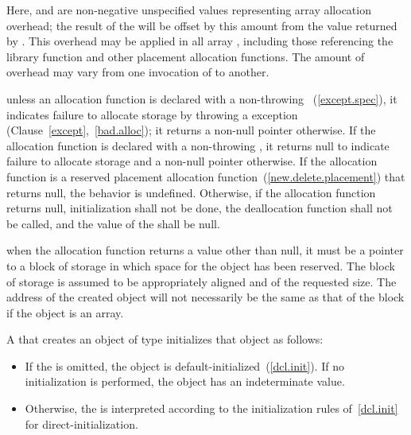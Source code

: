 Here,  and  are non-negative unspecified values
representing array allocation overhead; the result of the
 will be offset by this amount from the value
returned by . This overhead may be applied in all
array , including those referencing the
library function  and other
placement allocation functions. The amount of overhead may vary from one
invocation of  to another.
\exitexample 

\pnum
\enternote 
unless an allocation function is declared with a non-throwing
~(\ref{except.spec}),
it indicates failure to allocate storage by throwing a
%
%
 exception (Clause~\ref{except},~\ref{bad.alloc});
it returns a non-null pointer otherwise. If the allocation function is
declared with a non-throwing ,
it returns null to indicate failure to allocate storage
and a non-null pointer otherwise.
\exitnote 
If the allocation function is a reserved placement allocation
function~(\ref{new.delete.placement}) that returns null,
the behavior is undefined.
Otherwise,
if the allocation function returns null, initialization shall not be
done, the deallocation function shall not be called, and the value of
the  shall be null.

\pnum
\enternote 
when the allocation function returns a value other than null, it must be
a pointer to a block of storage in which space for the object has been
reserved. The block of storage is assumed to be appropriately aligned
and of the requested size. The address of the created object will not
necessarily be the same as that of the block if the object is an array.
\exitnote 

\pnum
{}%
%
%
%
%
%
%
A  that creates an object of type 
initializes that object as follows:

\begin{itemize}
\item If the  is omitted, the object is
default-initialized~(\ref{dcl.init}). \enternote If no initialization
is performed, the object has an indeterminate value. \exitnote

\item Otherwise, the  is interpreted according to
the initialization rules of~\ref{dcl.init} for direct-initialization.
\end{itemize}

